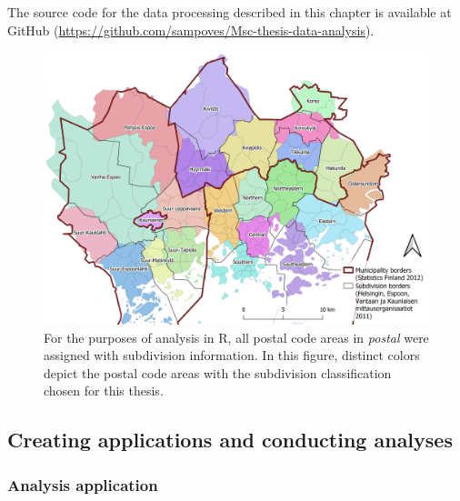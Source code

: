 The source code for the data processing described in this chapter is available at GitHub (\textcolor{blue}{\url{https://github.com/sampoves/Msc-thesis-data-analysis}}).

\begin{figure}[H]%
    \includegraphics[width=\textwidth]{images/thesis_subdiv_place.png}
    \caption[Placing postal code areas in subdivisions]{For the purposes of analysis in R, all postal code areas in \textit{postal} were assigned with subdivision information. In this figure, distinct colors depict the postal code areas with the subdivision classification chosen for this thesis.}%
    \label{fig:subdiv_placement}%
\end{figure}

\newpage
\subsection{Creating applications and conducting analyses}
\subsubsection{Analysis application}
\justify

